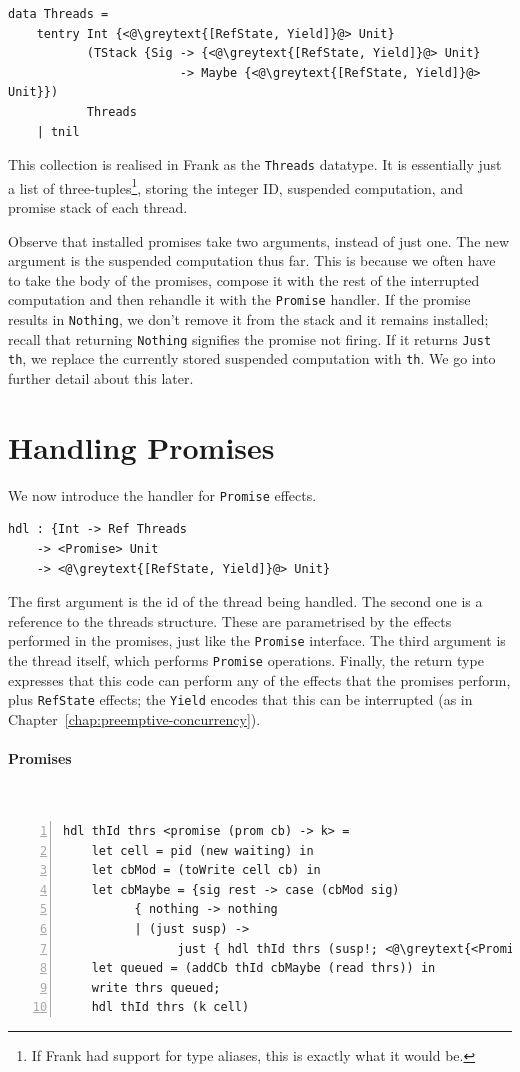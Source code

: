 \documentclass[msc,deptreport,cs]{infthesis} %
\newcommand{\code}[1]{\lstinline{#1}}
\newcommand{\greytext}[1]{\textcolor{black!40}{#1}}
\begin{document}
\begin{lstlisting}
data Threads =
    tentry Int {<@\greytext{[RefState, Yield]}@> Unit}
           (TStack {Sig -> {<@\greytext{[RefState, Yield]}@> Unit}
                        -> Maybe {<@\greytext{[RefState, Yield]}@> Unit}})
           Threads
    | tnil
\end{lstlisting}

This collection is realised in Frank as the \code{Threads} datatype. It is
essentially just a list of three-tuples\footnote{If Frank had support for type
  aliases, this is exactly what it would be.}, storing the integer ID, suspended
computation, and promise stack of each thread.

Observe that installed promises take two arguments, instead of just one. The new
argument is the suspended computation thus far. This is because we often have to
take the body of the promises, compose it with the rest of the interrupted
computation and then rehandle it with the \code{Promise} handler. If the promise
results in \code{Nothing}, we don't remove it from the stack and it remains
installed; recall that returning \code{Nothing} signifies the promise not
firing. If it returns \code{Just th}, we replace the currently stored suspended
computation with \code{th}. We go into further detail about this later.


\section{Handling Promises}
\label{sec:handling-promises}

We now introduce the handler for \code{Promise} effects.

\begin{lstlisting}
hdl : {Int -> Ref Threads
    -> <Promise> Unit
    -> <@\greytext{[RefState, Yield]}@> Unit}
\end{lstlisting}

The first argument is the id of the thread being handled. The second one is a
reference to the threads structure. These are parametrised by the effects
performed in the promises, just like the \code{Promise} interface. The third
argument is the thread itself, which performs \code{Promise} operations.
Finally, the return type expresses that this code can perform any of the effects
that the promises perform, plus \code{RefState} effects; the \code{Yield}
encodes that this can be interrupted (as in Chapter~\ref{chap:preemptive-concurrency}).

\paragraph*{Promises}~
\begin{lstlisting}[numbers=left]
hdl thId thrs <promise (prom cb) -> k> =
    let cell = pid (new waiting) in
    let cbMod = (toWrite cell cb) in
    let cbMaybe = {sig rest -> case (cbMod sig)
          { nothing -> nothing
          | (just susp) ->
                just { hdl thId thrs (susp!; <@\greytext{<Promise>}@> rest!)} }} in
    let queued = (addCb thId cbMaybe (read thrs)) in
    write thrs queued;
    hdl thId thrs (k cell)
\end{lstlisting}
\end{document}
